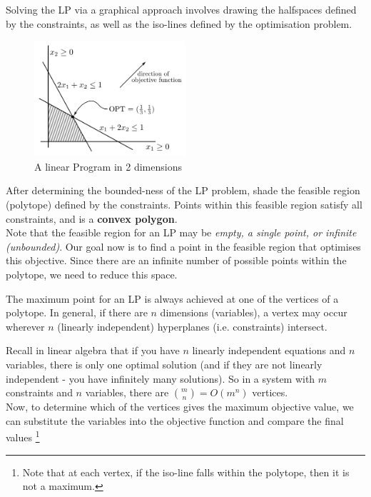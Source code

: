 \documentclass{article}
\begin{document}
Solving the LP via a graphical approach involves drawing the halfspaces defined by the constraints, as well as the iso-lines defined by the optimisation problem. \\

\begin{figure}[H]
    \centering
    \includegraphics[width=0.5\textwidth]{Images/LP_Graphical.png}
    \caption{A linear Program in 2 dimensions}
    \label{fig:lpdiag}
\end{figure} 

\noindent After determining the bounded-ness of the LP problem, shade the feasible region (polytope) defined by the constraints. Points within this feasible region satisfy all constraints, and is a \textbf{convex polygon}. \\

\noindent Note that the feasible region for an LP may be \textit{empty, a single point, or infinite (unbounded)}. Our goal now is to find a point in the feasible region that optimises this objective. Since there are an infinite number of possible points within the polytope, we need to reduce this space. 

\begin{theorem}
    The maximum point for an LP is always achieved at one of the vertices of a polytope. In general, if there are $n$ dimensions (variables), a vertex may occur wherever $n$ (linearly independent) hyperplanes (i.e. constraints) intersect.
\end{theorem}

\noindent Recall in linear algebra that if you have $n$ linearly independent equations and $n$ variables, there is only one optimal solution (and if they are not linearly independent - you have infinitely many solutions). So in a system with $m$ constraints and $n$ variables, there are $\binom{m}{n} = O(m^{n})$ vertices. \\ 

\noindent Now, to determine which of the vertices gives the maximum objective value, we can substitute the variables into the objective function and compare the final values \footnote{Note that at each vertex, if the iso-line falls within the polytope, then it is not a maximum.} 
\end{document}
